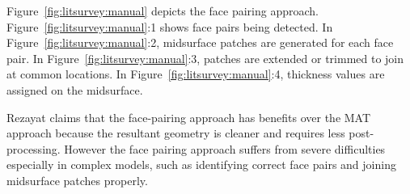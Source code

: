 Figure~\ref{fig:litsurvey:manual} depicts the face pairing approach. Figure~\ref{fig:litsurvey:manual}:1  shows face pairs being detected. In Figure~\ref{fig:litsurvey:manual}:2, midsurface patches are generated for each face pair. In Figure~\ref{fig:litsurvey:manual}:3, patches are extended or trimmed to join at common locations. In Figure~\ref{fig:litsurvey:manual}:4, thickness values are assigned on the midsurface.


	
Rezayat claims that the face-pairing approach has benefits over the MAT approach because the resultant geometry is cleaner and requires less post-processing. However the face pairing approach suffers from severe difficulties especially in complex models, such as identifying correct face pairs and joining midsurface patches properly.
	



